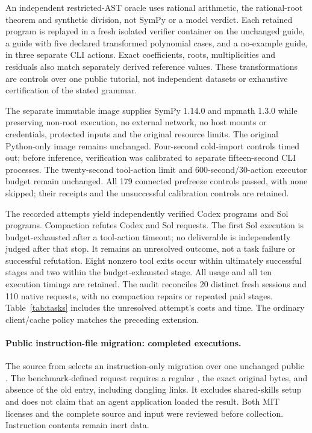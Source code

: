 An independent restricted-AST oracle uses rational arithmetic, the
rational-root theorem and synthetic division, not SymPy or a model verdict.
Each retained program is replayed in a fresh isolated verifier container on
the unchanged guide, a guide with five declared transformed polynomial cases,
and a no-example guide, in three separate CLI actions. Exact coefficients,
roots, multiplicities and residuals also match separately derived reference
values. These transformations are controls over one public tutorial, not
independent datasets or exhaustive certification of the stated grammar.

The separate immutable image supplies SymPy 1.14.0 and mpmath 1.3.0 while
preserving non-root execution, no external network, no host mounts or
credentials, protected inputs and the original resource limits. The original
Python-only image remains unchanged. Four-second cold-import controls timed
out; before inference, verification was calibrated to separate fifteen-second
CLI processes. The twenty-second tool-action limit and 600-second/30-action
executor budget remain unchanged. All 179 connected prefreeze controls passed,
with none skipped; their receipts and the unsuccessful calibration controls
are retained.

The \SymbolicExecutions{} recorded attempts yield
\SymbolicCodexAchieved{} independently verified Codex programs and
\SymbolicSolAchieved{} Sol programs. Compaction refutes
\SymbolicCodexRefuted{} Codex and \SymbolicSolRefuted{} Sol requests.
The first Sol execution is budget-exhausted after a tool-action timeout;
no deliverable is independently judged after that stop. It remains an
unresolved outcome, not a task failure or successful refutation. Eight nonzero
tool exits occur within ultimately successful stages and two within the
budget-exhausted stage. All usage and all ten execution timings are retained.
The audit reconciles 20 distinct fresh sessions and 110 native requests,
with no compaction repairs or repeated paid stages. Table~\ref{tab:tasks}
includes the unresolved attempt's costs and time. The ordinary client/cache
policy matches the preceding extension.

\paragraph{Public instruction-file migration: completed executions.}
The  source from  selects an
instruction-only migration over one unchanged public .
The benchmark-defined request requires a regular , the exact
original bytes, and absence of the old entry, including dangling links.
It excludes shared-skills setup and does not claim that an agent application
loaded the result. Both MIT licenses and the complete source and input were
reviewed before collection. Instruction contents remain inert data.

